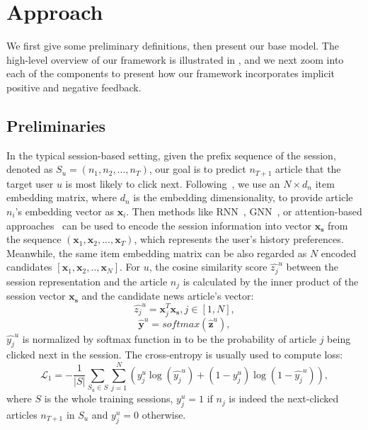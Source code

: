 \section{Approach}
\label{sec:approach}
We first give some preliminary definitions, then present our base model.
The high-level overview of our framework is illustrated in , 
and we next zoom into each of the components to 
present how our framework incorporates implicit positive and negative feedback.

\subsection{Preliminaries}
In the typical session-based setting, given the prefix sequence of the session, denoted as $S_u=(n_1, n_2,...,n_T)$, our goal is 
to predict $n_{T+1}$ article that the target user $u$ is most likely to click next. 
Following~\citeauthor{liu2018stamp}, we use an $N\times d_n$ 
item embedding matrix, where $d_n$ is the embedding dimensionality, to provide article $n_i$'s embedding vector
as $\mathbf{x}_i$. Then methods like RNN~\cite{hidasi2018recurrent}, GNN~\cite{wu2019session,pan2020star}, 
or attention-based approaches~\cite{kang_self-attentive_2018,liu2018stamp} can be used to 
encode the session information into vector $\mathbf{x_s}$ from the sequence 
${(\mathbf{x}_1, \mathbf{x}_2, ..., \mathbf{x}_T)}$, which represents the user's history preferences.
Meanwhile, the same item embedding matrix can be also regarded as $N$ encoded candidates $[\mathbf{x}_1, \mathbf{x}_2,.., \mathbf{x}_N]$.
For $u$, the cosine similarity score $\hat{z_j}^u$ between the session representation and the article $n_j$ is calculated by the inner product of the session vector $\mathbf{x_s}$ and the candidate news article's vector:
\begin{equation}
    \label{eq:zj}
    \hat{z_j}^u = \mathbf{x}_j^T\mathbf{x_s}, j\in[1,N],
\end{equation}
\begin{equation}
    \label{eq:yy}
    \hat{\mathbf{y}}^u = softmax(\hat{\mathbf{z}}^u),
\end{equation}
$\hat{y_j}^u$ is normalized by softmax function in  to be the probability of article $j$ being clicked next in the session. 
The cross-entropy is usually used to compute loss:
\begin{equation}
    \mathcal{L}_1 = - \frac{1}{|S|}\sum_{S_u \in S}\sum_{j=1}^N ( y_j^u \log(\hat{y_j}^u) + (1-y_j^u)\log(1-\hat{y_j}^u)),
\end{equation}
where $S$ is the whole training sessions, $y_j^u=1$ if $n_j$ is indeed the next-clicked articles $n_{T+1}$ in $S_u$ and $y_j^u=0$ otherwise.

